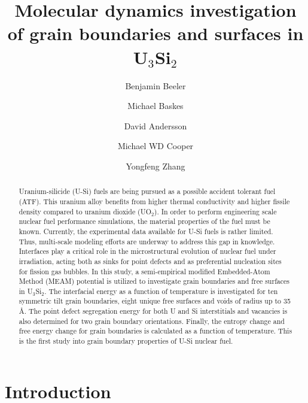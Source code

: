 \documentclass[review]{elsarticle}
\begin{document}
\begin{frontmatter}
\title{Molecular dynamics investigation of grain boundaries and surfaces in U$_{3}$Si$_{2}$}

\author[inl]{Benjamin Beeler}
\author[lanl,ucsd,msu]{Michael Baskes}
\author[lanl]{David Andersson}
\author[lanl]{Michael WD Cooper}
\author[inl]{Yongfeng Zhang}
\address[inl]{Idaho National Laboratory, Idaho Falls, ID 83415}
\address[lanl]{Los Alamos National Laboratory, Los Alamos, NM 87545}
\address[ucsd]{University of California-San Diego, San Diego, CA 92093}
\address[msu]{Mississippi State University, MS 39762}

\begin{abstract}

Uranium-silicide (U-Si) fuels are being pursued as a possible accident tolerant fuel (ATF). This uranium alloy benefits from higher thermal conductivity and higher fissile density compared to uranium dioxide (UO$_{2}$). In order to perform engineering scale nuclear fuel performance simulations, the material properties of the fuel must be known. Currently, the experimental data available for U-Si fuels is rather limited. Thus, multi-scale modeling efforts are underway to address this gap in knowledge. Interfaces play a critical role in the microstructural evolution of nuclear fuel under irradiation, acting both as sinks for point defects and as preferential nucleation sites for fission gas bubbles. In this study, a semi-empirical modified Embedded-Atom Method (MEAM) potential is utilized to investigate grain boundaries and free surfaces in U$_{3}$Si$_{2}$. The interfacial energy as a function of temperature is investigated for ten symmetric tilt grain boundaries, eight unique free surfaces and voids of radius up to 35 {\AA}. The point defect segregation energy for both U and Si interstitials and vacancies is also determined for two grain boundary orientations. Finally, the entropy change and free energy change for grain boundaries is calculated as a function of temperature. This is the first study into grain boundary properties of U-Si nuclear fuel. 

\end{abstract}
\end{frontmatter}

\section{Introduction}
\end{document}
